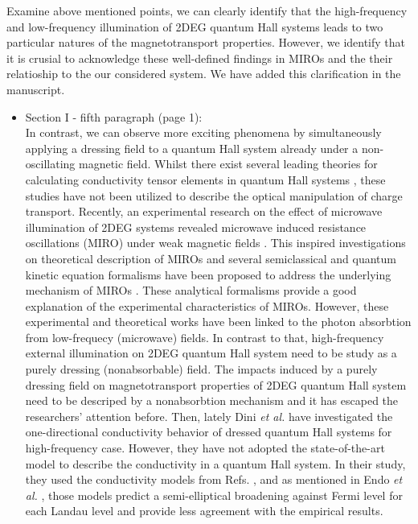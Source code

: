 \documentclass{article}
\begin{document}
Examine above mentioned points, we can clearly identify that the high-frequency and low-frequency illumination of 2DEG quantum Hall systems leads to two particular natures of the magnetotransport properties. However, we identify that it is crusial to acknowledge these well-defined findings in MIROs and the their relatioship to the our considered system. We have added this clarification in the manuscript.

\begin{itemize}
        \item Section I - fifth paragraph (page 1):\\
        {\color{Maroon}
        In contrast, we can observe more exciting phenomena by simultaneously applying a dressing field to a quantum Hall system already under a non-oscillating magnetic field.
        Whilst there exist several leading theories for calculating conductivity tensor elements in quantum Hall systems \cite{ando74_1,ando82,endo09}, these studies  have not been utilized to describe the optical manipulation of charge transport. Recently, an experimental research on the effect of microwave illumination of 2DEG systems revealed microwave induced resistance oscillations (MIRO) under weak magnetic fields \cite{zudov01,mani02,zudov03,mani04}.
        This inspired investigations on theoretical description of MIROs and several semiclassical and quantum kinetic equation formalisms have been proposed to address the underlying mechanism of MIROs \cite{durst03,dmitriev03,dmitriev05,dmitriev09}. These analytical formalisms provide a good explanation of the experimental characteristics of MIROs. However, these experimental and theoretical works have been linked to the photon absorbtion from low-frequecy (microwave) fields. In contrast to that, high-frequency external illumination on 2DEG quantum Hall system need to be study as a purely dressing (nonabsorbable) field.
        The impacts induced by a purely dressing field on magnetotransport properties of 2DEG quantum Hall system need to be descriped by a nonabsorbtion mechanism and it has escaped the researchers’ attention before.
        Then, lately Dini \textit{et al.} \cite{dini16} have investigated the one-directional conductivity behavior of dressed quantum Hall systems for high-frequency case. However, they have not adopted the state-of-the-art model to describe the conductivity in a quantum Hall system. In their study, they used the conductivity models from Refs. \cite{ando74_1,ando82}, and as mentioned in Endo \textit{et al.} \cite{endo09}, those models predict a semi-elliptical broadening against Fermi level for each Landau level and provide less agreement with the empirical results.
}
\end{itemize}
\end{document}
